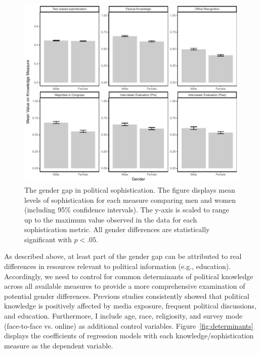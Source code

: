 \documentclass[12pt]{article}
\begin{document}
\begin{figure}[h]\centering
\includegraphics{../fig/meandiff.pdf}
\caption{The gender gap in political sophistication. The figure displays mean levels of sophistication for each measure comparing men and women (including 95\% confidence intervals). The y-axis is scaled to range up to the maximum value observed in the data for each sophistication metric. All gender differences are statistically significant with $p<.05$.}\label{fig:meandiff}
\end{figure}


As described above, at least part of the gender gap can be attributed to real differences in resources relevant to political information (e.g., education). Accordingly, we need to control for common determinants of political knowledge across all available measures to provide a more comprehensive examination of potential gender differences. Previous studies consistently showed that political knowledge is positively affected by media exposure, frequent political discussions, and education. Furthermore, I include age, race, religiosity, and survey mode (face-to-face vs. online) as additional control variables. Figure~\ref{fig:determinants} displays the coefficients of regression models with each knowledge/sophistication measure as the dependent variable.
\end{document}
